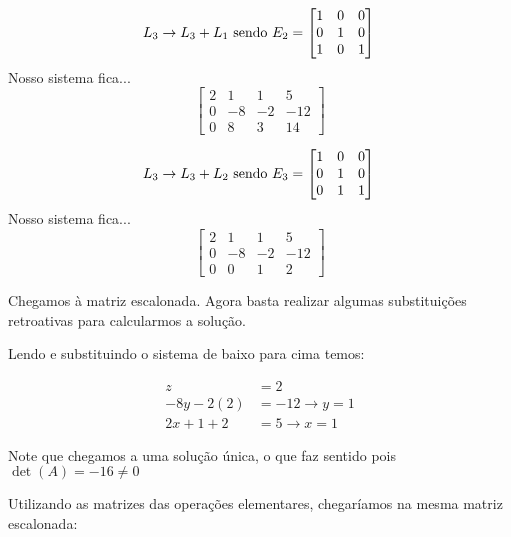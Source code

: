 \documentclass[12pt]{article}
\begin{document}
\begin{equation*}
	L_3 \rightarrow L_3 +L_1 \mbox{ sendo } 
	E_2=\begin{bmatrix}
		1 & 0 &0\\
		0 & 1 & 0\\
		1 & 0 & 1
	\end{bmatrix}\\
\end{equation*}
Nosso sistema fica...
\begin{equation*}
	\begin{bmatrix}
		2 & 1 & 1 & 5\\
		0 & -8 & -2 & -12\\
		0 & 8 & 3 & 14
	\end{bmatrix}
\end{equation*}


\begin{equation*}
	L_3 \rightarrow L_3 +L_2 \mbox{ sendo } 
	E_3=\begin{bmatrix}
		1 & 0 &0\\
		0 & 1 & 0\\
		0 & 1 & 1
	\end{bmatrix}\\
\end{equation*}
Nosso sistema fica...
\begin{equation*}
	\begin{bmatrix}
		2 & 1 & 1 & 5\\
		0 & -8 & -2 & -12\\
		0 & 0 & 1 & 2
	\end{bmatrix}
\end{equation*}

Chegamos à matriz escalonada. Agora basta realizar algumas substituições retroativas para calcularmos a solução.

Lendo e substituindo o sistema de baixo para cima temos:

\begin{align*}
	z&=2 \\
	-8y-2(2)&=-12 \rightarrow y=1 \\
	2x+1+2&=5 \rightarrow x=1	
\end{align*}

Note que chegamos a uma solução única, o que faz sentido pois $\det(A)=-16\neq0$

Utilizando as matrizes das operações elementares, chegaríamos na mesma matriz escalonada:
\end{document}
